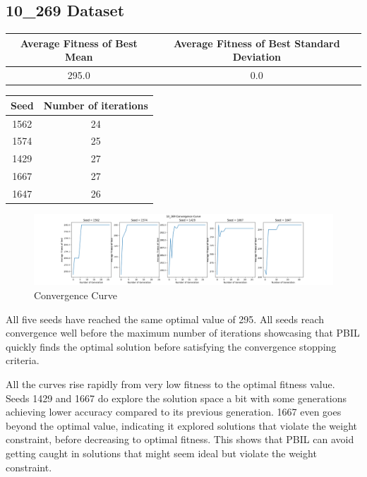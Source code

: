 \documentclass{article}
\begin{document}
\subsection*{10\_269 Dataset}
\begin{center}
\begin{tabular}{|c|c|}
	\hline
	Average Fitness of Best Mean & Average Fitness of Best Standard Deviation \\
	\hline
	295.0 & 0.0 \\
	\hline
\end{tabular}
\end{center}

\begin{center}
	\begin{tabular}{|c|c|}
		\hline
		Seed & Number of iterations \\
		\hline
		1562 & 24 \\
		\hline
		1574 & 25 \\
		\hline
		1429 & 27 \\
		\hline
		1667 & 27 \\
		\hline
		1647 & 26 \\
		\hline
	\end{tabular}
\end{center}

\begin{figure}[h!]
	\centering
	\includegraphics[width=\linewidth]{knapsack_10_269.png}
	\caption{Convergence Curve}
\end{figure}

All five seeds have reached the same optimal value of 295. All seeds reach convergence well before the maximum number of iterations showcasing that PBIL quickly finds the optimal solution before satisfying the convergence stopping criteria. \par
\noindent All the curves rise rapidly from very low fitness to the optimal fitness value. Seeds 1429 and 1667 do explore the solution space a bit with some generations achieving lower accuracy compared to its previous generation. 1667 even goes beyond the optimal value, indicating it explored solutions that violate the weight constraint, before decreasing to optimal fitness. This shows that PBIL can avoid getting caught in solutions that might seem ideal but violate the weight constraint. \par
\end{document}
